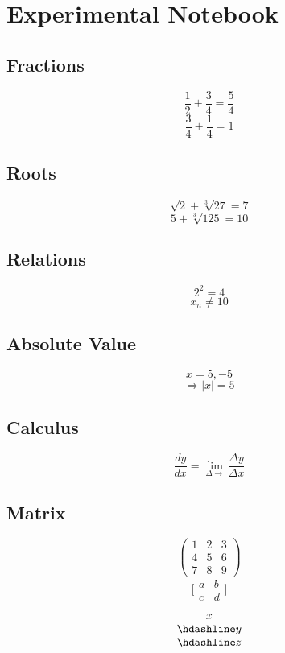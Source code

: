 \documentclass{article}
\begin{document}
\section{Experimental Notebook}
\subsection{Fractions}
$$\frac{1}{2}+\frac{3}{4}=\frac{5}{4}$$
$$\frac{3}{4}+\frac{1}{4}=1$$
\subsection{Roots}
$$\sqrt{2}+\sqrt[3]{27}=7$$
$$5+\sqrt[3]{125}=10$$
\subsection{Relations}
$$2^{2}=4$$
$$x_{n}\ne 10$$
\subsection{Absolute Value}
$$x=5, -5$$
$$\Rightarrow \left|x\right|=5$$
\subsection{Calculus}
$$\frac{dy}{dx}=\lim _{\Delta \rightarrow}\frac{\Delta y}{\Delta x}$$
\subsection{Matrix}
$$\begin{pmatrix}1 & 2 & 3 \\ 4 & 5 & 6 \\ 7 & 8 & 9\end{pmatrix}$$
$$\Biggl[\begin{matrix}a & b \\ c & d\end{matrix}\Biggr]$$
$$\begin{array}{c}x \\ \hdashline y \\ \hdashline z\end{array}$$
\end{document}
